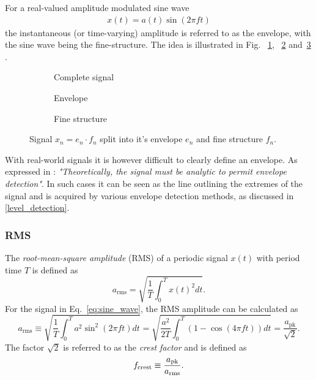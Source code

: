 \documentclass[../main2.tex]{subfiles}
\providecommand{\rootdir}{..}
\begin{document}
For a real-valued amplitude modulated sine wave
\begin{align}
x(t) = a(t)\sin(2 \pi f t)
\end{align}
the instantaneous (or time-varying) amplitude is referred to as the envelope, with the sine wave being the fine-structure. The idea is illustrated in Fig. ~\ref{fig:signal_env_fine_struct}, ~\ref{fig:signal_env} and~\ref{fig:signal_fine_struct} . 
\begin{figure}
\captionsetup{justification=centering}
\begin{subfigure}{\linewidth}
\centering
\centerline{}
\caption{Complete signal}
\label{fig:signal_env_fine_struct}
\end{subfigure}
\par\bigskip
\begin{subfigure}{.5\linewidth}
\centering

\caption{Envelope}
\label{fig:signal_env}
\end{subfigure}
\begin{subfigure}{.5\linewidth}
\centering

\caption{Fine structure}
\label{fig:signal_fine_struct}
\end{subfigure}%
\caption{Signal $x_n = e_n\cdot f_n$ split into it's envelope $e_n$ and fine structure $f_n$.}
\label{fig:analytic_signal}
\end{figure}

With real-world signals it is however difficult to clearly define an envelope. As expressed in \cite{bedrosian1962analytic}: \emph{"Theoretically, the signal must be analytic to permit envelope detection"}. In such cases it can be seen as the line outlining the extremes of the signal and is acquired by various envelope detection methods, as discussed in \ref{level_detection}. 
\subsubsection{RMS}
The \emph{root-mean-square amplitude} (RMS) of a periodic signal $x(t)$ with period time $T$ is defined as
\begin{equation}
a_\text{rms} = \sqrt{ \frac{1}{T} \int_{0}^{T} x(t)^2 dt }.
\end{equation}
For the signal in Eq.~\eqref{eq:sine_wave}, the RMS amplitude can be calculated as
\begin{equation}
a_\text{rms} \equiv
\sqrt{ \frac{1}{T} \int_{0}^{T} a^2 \sin^2 (2 \pi f t) dt } =
\sqrt{ \frac{a^2}{2T} \int_{0}^{T}\left( 1 - \cos (4 \pi f t) \right) dt } =
\frac{a_\text{pk}}{\sqrt 2}.
\end{equation}
The factor $\sqrt 2$ is referred to as the \emph{crest factor} and is defined as
\begin{align}
f_\text{crest} \equiv \frac{a_\text{pk}}{a_\text{rms}}. \label{eq:crest_factor}
\end{align}
\end{document}
